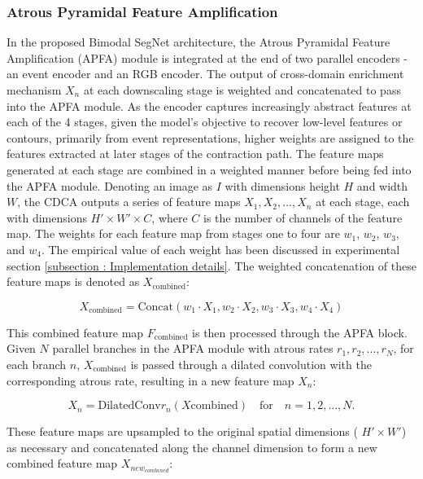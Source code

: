 \documentclass[lettersize,journal]{IEEEtran}
\begin{document}
\subsubsection{\textbf{Atrous Pyramidal Feature Amplification}}
\label{subsubsection : Atrous Pyramidal Feature Amplification}


In the proposed Bimodal SegNet architecture, the Atrous Pyramidal Feature Amplification (APFA) module is integrated at the end of two parallel encoders - an event encoder and an RGB encoder. The output of cross-domain enrichment mechanism $X_{n}$ at each downscaling stage is weighted and concatenated to pass into the APFA module. As the encoder captures increasingly abstract features at each of the 4 stages, given the model's objective to recover low-level features or contours, primarily from event representations, higher weights are assigned to the features extracted at later stages of the contraction path. The feature maps generated at each stage are combined in a weighted manner before being fed into the APFA module. Denoting an image as $I$ with dimensions height $H$ and width $W$, the CDCA outputs a series of feature maps $X_1, X_2, ..., X_n$ at each stage, each with dimensions $H' \times W' \times C$, where $C$ is the number of channels of the feature map. The weights for each feature map from stages one to four are $w_1$, $w_2$, $w_3$, and $w_4$. The empirical value of each weight has been discussed in experimental section \ref{subsection : Implementation details}. The weighted concatenation of these feature maps is denoted as $X_{\text{combined}}$:


\begin{equation}
X_{\text{combined}} = \text{Concat}(w_1 \cdot X_1, w_2 \cdot X_2, w_3 \cdot X_3, w_4 \cdot X_4)
\end{equation}


This combined feature map $F_{\text{combined}}$ is then processed through the APFA block. Given $N$ parallel branches in the APFA module with atrous rates $r_1, r_2, ..., r_N$, for each branch $n$, $X_{\text{combined}}$ is passed through a dilated convolution with the corresponding atrous rate, resulting in a new feature map $X_n$:

\begin{equation}
X_n = \text{DilatedConv}{r_n}(X{\text{combined}}) \quad \text{for} \quad n = 1, 2, ..., N.
\end{equation}


These feature maps are upsampled to the original spatial dimensions ( $H' \times W'$) as necessary and concatenated along the channel dimension to form a new combined feature map $X_{new_{combined}}$:
\end{document}
